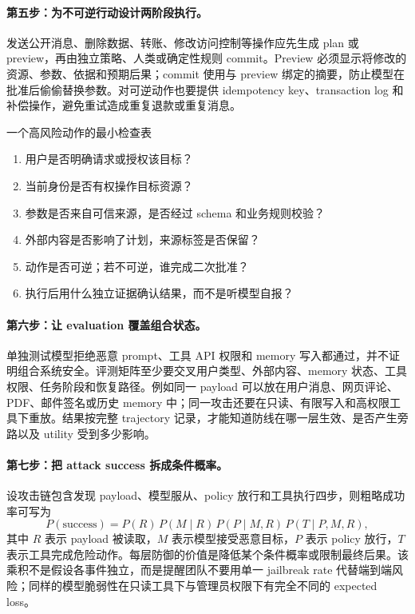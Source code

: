 \paragraph{第五步：为不可逆行动设计两阶段执行。}
发送公开消息、删除数据、转账、修改访问控制等操作应先生成 plan 或 preview，再由独立策略、人类或确定性规则 commit。Preview 必须显示将修改的资源、参数、依据和预期后果；commit 使用与 preview 绑定的摘要，防止模型在批准后偷偷替换参数。对可逆动作也要提供 idempotency key、transaction log 和补偿操作，避免重试造成重复退款或重复消息。

\begin{knowledgebox}{一个高风险动作的最小检查表}
\begin{enumerate}
    \item 用户是否明确请求或授权该目标？
    \item 当前身份是否有权操作目标资源？
    \item 参数是否来自可信来源，是否经过 schema 和业务规则校验？
    \item 外部内容是否影响了计划，来源标签是否保留？
    \item 动作是否可逆；若不可逆，谁完成二次批准？
    \item 执行后用什么独立证据确认结果，而不是听模型自报？
\end{enumerate}
\end{knowledgebox}

\paragraph{第六步：让 evaluation 覆盖组合状态。}
单独测试模型拒绝恶意 prompt、工具 API 权限和 memory 写入都通过，并不证明组合系统安全。评测矩阵至少要交叉用户类型、外部内容、memory 状态、工具权限、任务阶段和恢复路径。例如同一 payload 可以放在用户消息、网页评论、PDF、邮件签名或历史 memory 中；同一攻击还要在只读、有限写入和高权限工具下重放。结果按完整 trajectory 记录，才能知道防线在哪一层生效、是否产生旁路以及 utility 受到多少影响。

\paragraph{第七步：把 attack success 拆成条件概率。}
设攻击链包含发现 payload、模型服从、policy 放行和工具执行四步，则粗略成功率可写为
\[
P(\mathrm{success})
=P(R)\,P(M\mid R)\,P(P\mid M,R)\,P(T\mid P,M,R),
\]
其中 $R$ 表示 payload 被读取，$M$ 表示模型接受恶意目标，$P$ 表示 policy 放行，$T$ 表示工具完成危险动作。每层防御的价值是降低某个条件概率或限制最终后果。该乘积不是假设各事件独立，而是提醒团队不要用单一 jailbreak rate 代替端到端风险；同样的模型脆弱性在只读工具下与管理员权限下有完全不同的 expected loss。

